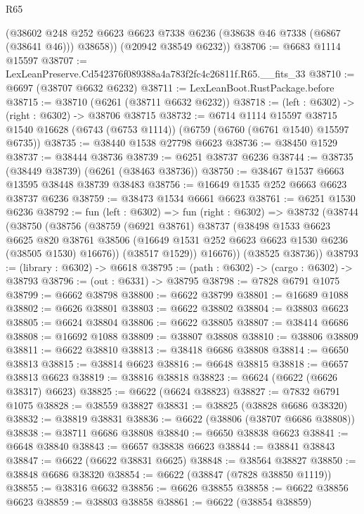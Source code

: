 \begin{lexlean}{R65}
\begin{coremodule}
{        (@38602 @248 @252 @6623 @6623 @7338 @6236 (@38638 @46 @7338 (@6867 (@38641 @46))) @38658))
      (@20942 @38549 @6232))
@38706 := @6683 @1114 @15597
@38707 := LexLeanPreserve.Cd542376f089388a4a783f2fc4c26811f.R65.__fits_33
@38710 := @6697 (@38707 @6632 @6232)
@38711 := LexLeanBoot.RustPackage.before
@38715 := @38710 (@6261 (@38711 @6632 @6232))
@38718 := (left : @6302) -> (right : @6302) -> @38706 @38715
@38732 := @6714
    @1114
    @15597
    @38715
    @1540
    @16628
    (@6743 (@6753 @1114))
    (@6759 (@6760 (@6761 @1540) @15597 @6735))
@38735 := @38440 @1538 @27798 @6623
@38736 := @38450 @1529
@38737 := @38444 @38736
@38739 := @6251 @38737 @6236
@38744 := @38735 (@38449 @38739) (@6261 (@38463 @38736))
@38750 := @38467 @1537 @6663 @13595 @38448 @38739 @38483
@38756 := @16649 @1535 @252 @6663 @6623 @38737 @6236
@38759 := @38473 @1534 @6661 @6623
@38761 := @6251 @1530 @6236
@38792 := fun (left : @6302) =>
  fun (right : @6302) =>
  @38732
    (@38744
      (@38750
        (@38756
          (@38759
            (@6921 @38761)
            @38737
            (@38498
              @1533
              @6623
              @6625
              @820
              @38761
              @38506
              (@16649 @1531 @252 @6623 @6623 @1530 @6236 (@38505 @1530) @16676))
            (@38517 @1529))
          @16676))
      (@38525 @38736))
@38793 := (library : @6302) -> @6618
@38795 := (path : @6302) -> (cargo : @6302) -> @38793
@38796 := (out : @6331) -> @38795
@38798 := @7828 @6791 @1075
@38799 := @6662 @38798
@38800 := @6622 @38799
@38801 := @16689 @1088
@38802 := @6626 @38801
@38803 := @6622 @38802
@38804 := @38803 @6623
@38805 := @6624 @38804
@38806 := @6622 @38805
@38807 := @38414 @6686
@38808 := @16692 @1088
@38809 := @38807 @38808
@38810 := @38806 @38809
@38811 := @6622 @38810
@38813 := @38418 @6686 @38808
@38814 := @6650 @38813
@38815 := @38814 @6623
@38816 := @6648 @38815
@38818 := @6657 @38813 @6623
@38819 := @38816 @38818
@38823 := @6624 (@6622 (@6626 @38317) @6623)
@38825 := @6622 (@6624 @38823)
@38827 := @7832 @6791 @1075
@38828 := @38559 @38827
@38831 := @38825 (@38828 @6686 @38320)
@38832 := @38819 @38831
@38836 := @6622 (@38806 (@38707 @6686 @38808))
@38838 := @38711 @6686 @38808
@38840 := @6650 @38838 @6623
@38841 := @6648 @38840
@38843 := @6657 @38838 @6623
@38844 := @38841 @38843
@38847 := @6622 (@6622 @38831 @6625)
@38848 := @38564 @38827
@38850 := @38848 @6686 @38320
@38854 := @6622 (@38847 (@7828 @38850 @1119))
@38855 := @38316 @6632
@38856 := @6626 @38855
@38858 := @6622 @38856 @6623
@38859 := @38803 @38858
@38861 := @6622 (@38854 @38859)
}
\end{coremodule}
\end{lexlean}
